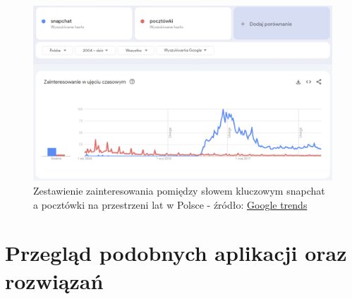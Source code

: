 \documentclass[a4paper,twoside,12pt]{book}
\begin{document}
\begin{figure}[H]
    \centering
    \includegraphics[width=1\textwidth]{porownanie.png}
    \captionsetup{justification=centering}
    \caption{Zestawienie zainteresowania pomiędzy słowem kluczowym snapchat a pocztówki na przestrzeni lat w Polsce - źródło: \href{https://trends.google.pl/trends/}{Google trends}}
\end{figure}

\newpage
\section{Przegląd podobnych aplikacji oraz rozwiązań}
\end{document}
